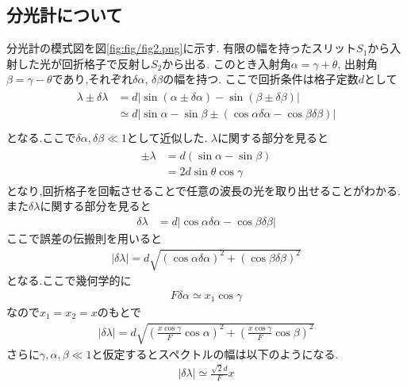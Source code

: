 \subsection{分光計について}
分光計の模式図を図\ref{fig:fig/fig2.png}に示す.
有限の幅を持ったスリット$S_1$から入射した光が回折格子で反射し$S_2$から出る.
このとき入射角$\alpha=\gamma+\theta$, 出射角$\beta=\gamma-\theta$であり,それぞれ$\delta\alpha$, $\delta\beta$の幅を持つ.
ここで回折条件は格子定数$d$として
\begin{align}
  \begin{split}
    \lambda\pm\delta\lambda&=d|\sin(\alpha\pm\delta\alpha)-\sin(\beta\pm\delta\beta)|\\
    &\simeq d|\sin\alpha-\sin\beta\pm(\cos\alpha\delta\alpha-\cos\beta\delta\beta)|\\
  \end{split}
\end{align}
となる.ここで$\delta\alpha,\delta\beta\ll1$として近似した.
$\lambda$に関する部分を見ると
\begin{align}
  \begin{split}
    \pm\lambda&=d(\sin\alpha-\sin\beta)\\
    &=2d\sin\theta\cos\gamma
  \end{split}
\end{align}
となり,回折格子を回転させることで任意の波長の光を取り出せることがわかる.
また$\delta\lambda$に関する部分を見ると
\begin{align}
    \delta\lambda&=d|\cos\alpha\delta\alpha-\cos\beta\delta\beta|
\end{align}
ここで誤差の伝搬則を用いると
\begin{align}
  |\delta\lambda|=d\sqrt{(\cos\alpha\delta\alpha)^2+(\cos\beta\delta\beta)^2}
\end{align}
となる.ここで幾何学的に
\begin{align}
  F\delta\alpha\simeq x_1\cos\gamma
\end{align}
なので$x_1=x_2=x$のもとで
\begin{align}
  |\delta\lambda|=d\sqrt{\left(\frac{x\cos\gamma}{F}\cos\alpha\right)^2+\left(\frac{x\cos\gamma}{F}\cos\beta\right)^2}
\end{align}
さらに$\gamma,\alpha,\beta\ll1$と仮定するとスペクトルの幅は以下のようになる.
\begin{align}
  |\delta\lambda|\simeq \frac{\sqrt{2}d}{F}x
\end{align}

